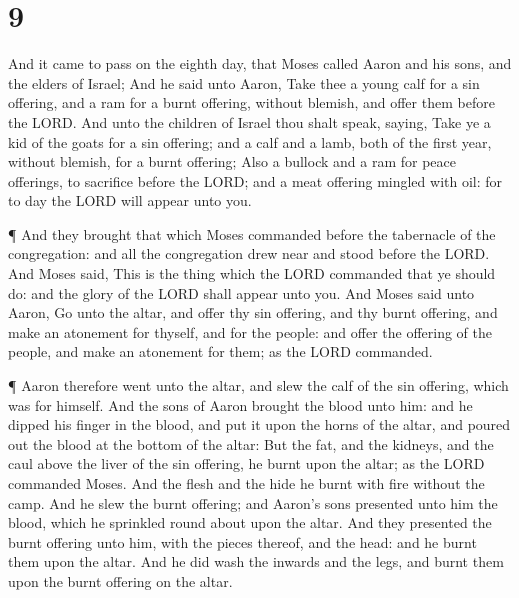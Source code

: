 \hypertarget{section-8}{%
\section{9}\label{section-8}}

 And it came to pass on the eighth day, that Moses called
Aaron and his sons, and the elders of Israel;  And he said
unto Aaron, Take thee a young calf for a sin offering, and a ram for a
burnt offering, without blemish, and offer them before the LORD.
 And unto the children of Israel thou shalt speak, saying,
Take ye a kid of the goats for a sin offering; and a calf and a lamb,
both of the first year, without blemish, for a burnt offering;
 Also a bullock and a ram for peace offerings, to sacrifice
before the LORD; and a meat offering mingled with oil: for to day the
LORD will appear unto you.

 ¶ And they brought that which Moses commanded before the
tabernacle of the congregation: and all the congregation drew near and
stood before the LORD.  And Moses said, This is the thing
which the LORD commanded that ye should do: and the glory of the LORD
shall appear unto you.  And Moses said unto Aaron, Go unto
the altar, and offer thy sin offering, and thy burnt offering, and make
an atonement for thyself, and for the people: and offer the offering of
the people, and make an atonement for them; as the LORD commanded.

 ¶ Aaron therefore went unto the altar, and slew the calf of
the sin offering, which was for himself.  And the sons of
Aaron brought the blood unto him: and he dipped his finger in the blood,
and put it upon the horns of the altar, and poured out the blood at the
bottom of the altar:  But the fat, and the kidneys, and the
caul above the liver of the sin offering, he burnt upon the altar; as
the LORD commanded Moses.  And the flesh and the hide he
burnt with fire without the camp.  And he slew the burnt
offering; and Aaron's sons presented unto him the blood, which he
sprinkled round about upon the altar.  And they presented
the burnt offering unto him, with the pieces thereof, and the head: and
he burnt them upon the altar.  And he did wash the inwards
and the legs, and burnt them upon the burnt offering on the altar.

